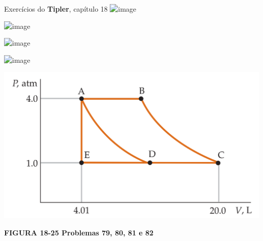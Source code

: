 \documentclass[t,%
brazilian,%
11pt,%
aspectratio=169,%
table%
]{beamer}
\begin{document}

\begin{frame}{Exercícios do \textbf{Tipler}, capítulo 18}
    \centering
    \includegraphics<+>[width=\textwidth]{images/Captura de tela de 2024-03-20 09-32-41.png}

    \includegraphics<+>[width=\textwidth]{images/Captura de tela de 2024-03-20 09-32-52.png}

    \includegraphics<+>[width=\textwidth]{images/Captura de tela de 2024-03-20 09-33-11.png}

    \includegraphics<+>[width=\textwidth]{images/Captura de tela de 2024-03-20 09-33-25.png}

    \includegraphics[width=\textwidth-133pt*\real{1.74}]{images/figura_18-25.png}

    \textbf{FIGURA 18-25 Problemas 79, 80, 81 e 82}

\end{frame}
\end{document}
